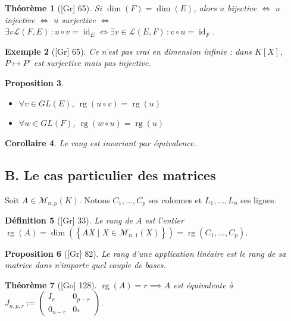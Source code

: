 \documentclass[10pt, a4paper, parskip=full, twoside, twocolumn]{report}
\newtheorem{definition}{Définition}
\newtheorem{theorem}[definition]{Théorème}
\newtheorem{proposition}[definition]{Proposition}
\newtheorem{corollary}[definition]{Corollaire}
\newtheorem{example}[definition]{Exemple}
\DeclareMathOperator{\rg}{rg}
\DeclareMathOperator{\id}{id}
\begin{document}
\begin{theorem}[\textnormal{[Gr] 65}]
	Si $\dim(F) = \dim(E)$, alors $u$ bijective $\iff$ $u$ injective 
	$\iff$ $u$ surjective $\iff$ $\exists v\mathcal{L}(F,E)\,\colon u\circ v = \id_E \iff \exists v\in \mathcal{L}(E,F)\,\colon v\circ u = \id_F$.
\end{theorem}

\begin{example}[\textnormal{[Gr] 65}]
	Ce n'est pas vrai en dimension infinie : dans $K[X]$, $P\mapsto P'$ est 
	surjective mais pas injective.
\end{example}

\begin{proposition}
	\begin{itemize}
		\item $\forall v\in GL(E)$, $\rg(u\circ v) = \rg(u)$
		\item $\forall w \in GL(F)$, $\rg(w\circ u) = \rg(u)$
	\end{itemize}
\end{proposition}

\begin{corollary}
	Le rang est invariant par équivalence.
\end{corollary}

\subsection*{B. Le cas particulier des matrices}
\textcolor{paragraphtext}{Soit $A\in\mathcal{M}_{n,p}(K)$. Notons $C_1,\dots, C_p$ ses colonnes et $L_1,\dots, L_n$ ses lignes.}

\begin{definition}[\textnormal{[Gr] 33}]
	Le \emph{rang de $A$} est l'entier $\rg(A) = \dim\left(\left\{AX\mid X\in\mathcal{M}_{n,1}(X)\right\}\right) = \rg(C_1,\dots,C_p)$.
\end{definition}

\begin{proposition}[\textnormal{[Gr] 82}]
	Le rang d'une application linéaire est le rang de sa matrice dans n'importe quel couple de bases.
\end{proposition}

\begin{theorem}[\textnormal{[Go] 128}]
	$\rg(A) = r\implies A$ est équivalente à $J_{n,p,r} := \begin{pmatrix}
		I_r & 0_{p-r} \\ 0_{n-r} & 0_*
	\end{pmatrix}$.
\end{theorem}
\end{document}
